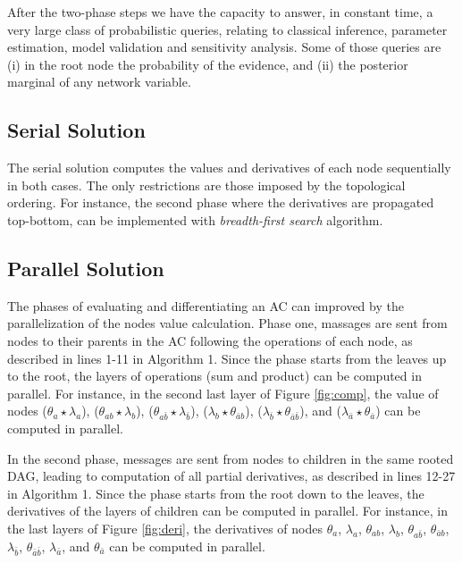 \documentclass[twoside,11pt]{article}
\begin{document}
After the two-phase steps we have the capacity to answer, in constant time, a very large class of probabilistic queries, relating to classical inference, parameter estimation, model validation and sensitivity analysis.
Some of those queries are
(i) in the root node the probability of the evidence, and 
(ii) the posterior marginal of any network variable.

\subsection{Serial Solution}

The serial solution computes the values and derivatives of each node sequentially in both cases.
The only restrictions are those imposed by the topological ordering.
For instance, the second phase where the derivatives are propagated top-bottom, can be implemented with \emph{breadth-first search} algorithm.

\subsection{Parallel Solution}

The phases of evaluating and differentiating an AC can improved by the parallelization of the nodes value calculation.
Phase one, massages are sent from nodes to their parents in the AC following the operations of each node, as described in lines 1-11 in Algorithm 1.
Since the phase starts from the leaves up to the root, the layers of operations (sum and product) can be computed in parallel.
For instance, in the second last layer of Figure \ref{fig:comp}, the value of nodes 
($\theta_a \star \lambda_a$), 
($\theta_{ab} \star \lambda_{{b}}$), 
($\theta_{a{\bar b}} \star \lambda_{{\bar b}}$),
($\lambda_{{b}} \star \theta_{{\bar a}b}$),
($\lambda_{{\bar b}} \star \theta_{{\bar a}\bar{b}}$), and
($\lambda_{{\bar a}} \star \theta_{{\bar a}}$) 
can be computed in parallel.


In the second phase, messages are sent from nodes to children in the same rooted DAG, leading to computation of all partial derivatives, as described in lines 12-27 in Algorithm 1.
Since the phase starts from the root down to the leaves, the derivatives of the layers of children can be computed in parallel.
For instance, in the last layers of Figure \ref{fig:deri}, the derivatives of  nodes 
$\theta_a $,
$\lambda_a$,
$\theta_{ab}$,
$\lambda_{{b}}$,
$\theta_{a{\bar b}}$,
$\theta_{{\bar a}b}$,
$\lambda_{{\bar b}}$,
$\theta_{\bar{a}\bar{b}}$,
$\lambda_{{\bar a}}$, and
$\theta_{{\bar a}}$
can be computed in parallel.
 
\end{document}
